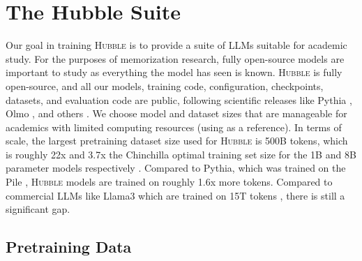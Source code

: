 \documentclass{article} %
\begin{document}
\section{The Hubble Suite}
\label{sec:training_setup}

Our goal in training \textsc{Hubble} is to provide a suite of LLMs suitable for academic study. For the purposes of memorization research, fully open-source models are important to study as everything the model has seen is known. \textsc{Hubble} is fully open-source, and all our models, training code, configuration, checkpoints, datasets, and evaluation code are public, following scientific releases like Pythia \citep{DBLP:conf/icml/BidermanSABOHKP23}, Olmo \citep{groeneveld-etal-2024-olmo}, and others \citep{apertus2024,liu2023llm360fullytransparentopensource}. We choose model and dataset sizes that are manageable for academics with limited computing resources (using \citealp{khandelwal2025k} as a reference).
In terms of scale, the largest pretraining dataset size used for \textsc{Hubble} is 500B tokens, which is roughly 22x and 3.7x the Chinchilla optimal training set size for the 1B and 8B parameter models respectively \citep{10.5555/3600270.3602446_chinchilla}. Compared to Pythia, which was trained on the Pile \citep{gao2020pile800gbdatasetdiverse}, \textsc{Hubble} models are trained on roughly 1.6x more tokens. Compared to commercial LLMs like Llama3 which are trained on 15T tokens \citep{grattafiori2024llama3herdmodels}, there is still a significant gap.

\subsection{Pretraining Data}
\end{document}
